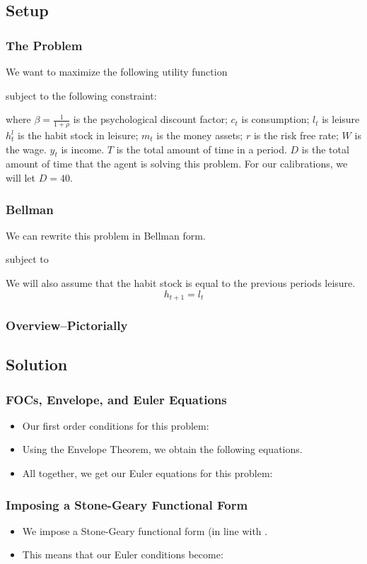 \documentclass[pdflatex]{beamer}
\begin{document}
\subsection{Setup}
\begin{frame}
\frametitle{The Problem}
We want to maximize the following utility function

subject to the following constraint:

where $\beta = \frac{1}{1+\rho}$ is the psychological discount factor; $c_t$ is consumption; $l_t$ is leisure $h_t^l$ is the habit stock in leisure; $m_t$ is the money assets; $r$ is the risk free rate; $W$ is the wage. $y_t$ is income. $T$ is the total amount of time in a period. $D$ is the total amount of time that the agent is solving this problem. For our calibrations, we will let $D=40$.  
\end{frame}
\begin{frame}
  \frametitle{Bellman}
  We can rewrite this problem in Bellman form.
  
  subject  to
  
  We will also assume that the habit stock is equal to the previous periods leisure.
  $$ h_{t+1} = l_t$$
\end{frame}


\begin{frame}
  \frametitle{Overview--Pictorially}
  

\end{frame}

\subsection{Solution}

\begin{frame}
  \frametitle{FOCs, Envelope, and Euler Equations}
  \begin{itemize}
  \item Our first order conditions for this problem:
    
  \item Using the Envelope Theorem, we obtain the following equations.
    
  \item All together, we get our Euler equations for this problem:
    
  \end{itemize}
  
\end{frame}


\begin{frame}
  \frametitle{Imposing a Stone-Geary Functional Form}
  \begin{itemize}
  \item We impose a Stone-Geary functional form (in line with \cite{bover1991relaxing}.
    
  \item This means that our Euler conditions become:
    
    \end{itemize}
\end{frame}
\end{document}
